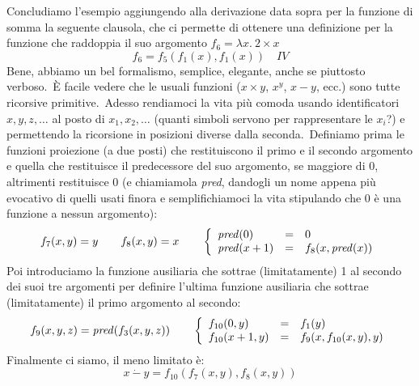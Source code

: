 \begin{example}{\label{Somma}}
    Concludiamo l'esempio aggiungendo alla derivazione data sopra per la funzione di somma la seguente clausola, che ci permette di ottenere una definizione per la funzione che raddoppia il suo argomento $f_6 = \lambda x.\ 2 \times x$
    \[f_6 = f_5(f_1(x), f_1(x))\quad \mathit{IV}\]
    Bene, abbiamo un bel formalismo, semplice, elegante, anche se piuttosto verboso.\
    È facile vedere che le usuali funzioni ($x \times y$, $x^y$, $x-y$, ecc.) sono tutte ricorsive primitive.\
    Adesso rendiamoci la vita più comoda usando identificatori $x,y,z,\dots$ al posto di $x_1, x_2,\dots$ (quanti simboli servono per rappresentare le $x_i$?) e permettendo la ricorsione in posizioni diverse dalla seconda.\
    Definiamo prima le funzioni proiezione (a due posti) che restituiscono il primo e il secondo argomento e quella che restituisce il predecessore del suo argomento, se maggiore di 0, altrimenti restituisce 0 (e chiamiamola \textit{pred}, dandogli un nome appena più evocativo di quelli usati finora e semplifichiamoci la vita stipulando che 0 è una funzione a nessun argomento):
    \[f_7(x,y)=y \qquad f_8(x,y)= x \qquad \left\{\begin{array}{l c l}
            \mathit{pred}(0)   & = & 0                        \\
            \mathit{pred}(x+1) & = & f_8(x, \mathit{pred}(x)) \\
        \end{array}\right.\]
    Poi introduciamo la funzione ausiliaria che sottrae (limitatamente) 1 al secondo dei suoi tre argomenti per definire l'ultima funzione ausiliaria che sottrae (limitatamente) il primo argomento al secondo:
    \[f_9(x,y,z) = \mathit{pred}(f_3(x,y,z)) \qquad \left\{\begin{array}{l c l}
            f_{10}(0,y)   & = & f_1(y)                \\
            f_{10}(x+1,y) & = & f_9(x, f_{10}(x,y),y) \\
        \end{array}\right.\]
    Finalmente ci siamo, il meno limitato è:
    \[x\ \dot{-}\ y = f_{10}(f_7(x,y), f_8(x,y))\]
\end{example}

